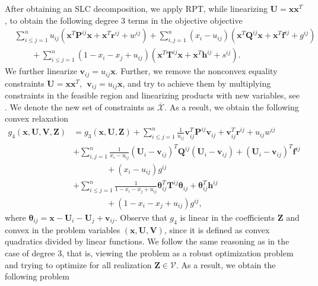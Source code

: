 \documentclass[opre,nonblindrev]{informs3} %
\begin{document}
{\color{black} After obtaining an SLC decomposition, we apply RPT, while linearizing $\boldsymbol{U} = \boldsymbol{x} \boldsymbol{x}^T$, to obtain the following degree 3 terms in the objective objective
\begin{align*}
    & \sum_{i \le j=1}^n u_{ij} \left( \boldsymbol{x}^T \boldsymbol{P}^{ij} \boldsymbol{x} + \boldsymbol{x}^T \boldsymbol{r}^{ij} + w^{ij} \right) + \sum_{i,j=1}^n (x_i-u_{ij}) \left( \boldsymbol{x}^T \boldsymbol{Q}^{ij} \boldsymbol{x} + \boldsymbol{x}^T \boldsymbol{f}^{ij} + g^{ij} \right) \\ 
    &\quad \quad + \sum_{i \le j=1}^n (1-x_i-x_j+u_{ij}) \left( \boldsymbol{x}^T \boldsymbol{T}^{ij} \boldsymbol{x} + \boldsymbol{x}^T \boldsymbol{h}^{ij} + s^{ij} \right).
\end{align*}  
We further linearize $\boldsymbol{v}_{ij} = u_{ij} \boldsymbol{x}$. Further, we remove the nonconvex equality constraints $\boldsymbol{U} = \boldsymbol{x} \boldsymbol{x}^T, \: \: \boldsymbol{v}_{ij} = u_{ij} \boldsymbol{x} $, and try to achieve them by multiplying constraints in the feasible region and linearizing products with new variables, see \cite{bertsimascone}. We denote the new set of constraints as $\overline{\mathcal{X}}$. As a result, we obtain the following convex relaxation 
\begin{align*}
    g_4(\boldsymbol{x},\boldsymbol{U},\boldsymbol{V},\boldsymbol{Z}) &= g_3(\boldsymbol{x},\boldsymbol{U},\boldsymbol{Z}) + \sum_{i \le j =1}^n \frac{1}{u_{ij}} \boldsymbol{v}_{ij}^T \boldsymbol{P}^{ij} \boldsymbol{v}_{ij} + \boldsymbol{v}_{ij}^T \boldsymbol{r}^{ij} + u_{ij} w^{ij} \\  
    &+ \sum_{i,j=1}^n \frac{1}{x_i-u_{ij}} \left( \boldsymbol{U}_i - \boldsymbol{v}_{ij} \right)^T \boldsymbol{Q}^{ij} \left( \boldsymbol{U}_i - \boldsymbol{v}_{ij} \right) + \left( \boldsymbol{U}_i - \boldsymbol{v}_{ij} \right)^T \boldsymbol{f}^{ij} \\ 
    &\quad \quad \quad \quad + (x_i-u_{ij})g^{ij} \\ 
    &+ \sum_{i \le j=1}^n \frac{1}{1-x_i-x_j+u_{ij}} \boldsymbol{\theta}_{ij}^T \boldsymbol{T}^{ij} \boldsymbol{\theta}_{ij} +  \boldsymbol{\theta}_{ij}^T \boldsymbol{h}^{ij} \\ 
    &\quad \quad \quad \quad + (1-x_i-x_j+u_{ij})g^{ij}, 
\end{align*}    
where $\boldsymbol{\theta}_{ij} = \boldsymbol{x} - \boldsymbol{U}_i - \boldsymbol{U}_j + \boldsymbol{v}_{ij}$. Observe that $g_4$ is linear in the coefficients $\boldsymbol{Z}$ and convex in the problem variables $\left(\boldsymbol{x},\boldsymbol{U},\boldsymbol{V}\right)$, since it is defined as convex quadratics divided by linear functions. We follow the same reasoning as in the case of degree 3, that is, viewing the problem as a robust optimization problem and trying to optimize for all realization $\boldsymbol{Z} \in \mathcal{V}$. As a result, we obtain the following problem
}
\end{document}
